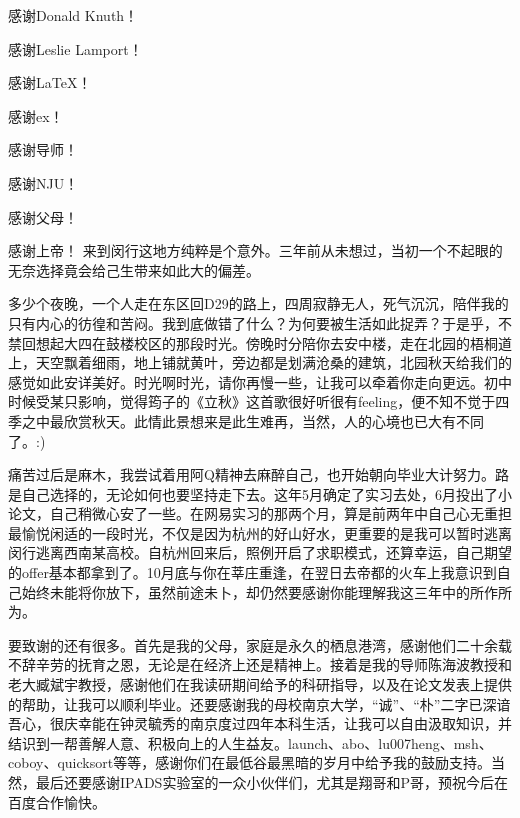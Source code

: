 
\begin{thanks}
感谢Donald Knuth！

感谢Leslie Lamport！

感谢\LaTeX！

感谢ex！

感谢导师！

感谢NJU！

感谢父母！

感谢上帝！
\iffalse
来到闵行这地方纯粹是个意外。三年前从未想过，当初一个不起眼的无奈选择竟会给己生带来如此大的偏差。

多少个夜晚，一个人走在东区回D29的路上，四周寂静无人，死气沉沉，陪伴我的只有内心的彷徨和苦闷。我到底做错了什么？为何要被生活如此捉弄？于是乎，不禁回想起大四在鼓楼校区的那段时光。傍晚时分陪你去安中楼，走在北园的梧桐道上，天空飘着细雨，地上铺就黄叶，旁边都是划满沧桑的建筑，北园秋天给我们的感觉如此安详美好。时光啊时光，请你再慢一些，让我可以牵着你走向更远。初中时候受某只影响，觉得筠子的《立秋》这首歌很好听很有feeling，便不知不觉于四季之中最欣赏秋天。此情此景想来是此生难再，当然，人的心境也已大有不同了。:)

痛苦过后是麻木，我尝试着用阿Q精神去麻醉自己，也开始朝向毕业大计努力。路是自己选择的，无论如何也要坚持走下去。这年5月确定了实习去处，6月投出了小论文，自己稍微心安了一些。在网易实习的那两个月，算是前两年中自己心无重担最愉悦闲适的一段时光，不仅是因为杭州的好山好水，更重要的是我可以暂时逃离闵行逃离西南某高校。自杭州回来后，照例开启了求职模式，还算幸运，自己期望的offer基本都拿到了。10月底与你在莘庄重逢，在翌日去帝都的火车上我意识到自己始终未能将你放下，虽然前途未卜，却仍然要感谢你能理解我这三年中的所作所为。

要致谢的还有很多。首先是我的父母，家庭是永久的栖息港湾，感谢他们二十余载不辞辛劳的抚育之恩，无论是在经济上还是精神上。接着是我的导师陈海波教授和老大臧斌宇教授，感谢他们在我读研期间给予的科研指导，以及在论文发表上提供的帮助，让我可以顺利毕业。还要感谢我的母校南京大学，``诚''、``朴''二字已深谙吾心，很庆幸能在钟灵毓秀的南京度过四年本科生活，让我可以自由汲取知识，并结识到一帮善解人意、积极向上的人生益友。launch、abo、lu007heng、msh、coboy、quicksort等等，感谢你们在最低谷最黑暗的岁月中给予我的鼓励支持。当然，最后还要感谢IPADS实验室的一众小伙伴们，尤其是翔哥和P哥，预祝今后在百度合作愉快。


\end{thanks}

